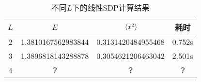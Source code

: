
\begin{table}
    \caption{不同$L$下的线性SDP计算结果}
    \label{tbl:linear-sdp-oscillator-result}
    \centering
    \begin{tabular}{cccc}
        \toprule
          $L$ & $E$ & $\expval*{x^2}$ & 耗时 \\
        \midrule
          2 & 1.3810167562983844  & 0.3131420484955468 & 0.752s  \\
          3 & 1.3896818143288878  & 0.3054621206463042 & 2.501s  \\
          4 & ？  & ？& ？  \\
        \bottomrule
    \end{tabular}
\end{table}